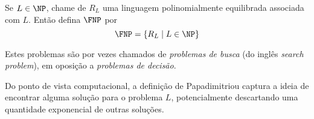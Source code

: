 \begin{definition}
    Se $L \in \NP$, chame de $R_L$
    uma linguagem polinomialmente equilibrada associada com $L$.
    Então defina $\FNP$ por
    \begin{equation*}
        \FNP = \{R_L \mid L \in \NP\}
    \end{equation*}
    \cite[p.~229]{Papadimitriou1994}
\end{definition}

Estes problemas são por vezes chamados de \emph{problemas de busca}
(do inglês \emph{search problem}),
em oposição a \emph{problemas de decisão}.

Do ponto de vista computacional,
a definição de Papadimitriou captura a ideia de
encontrar alguma solução para o problema $L$,
potencialmente descartando uma quantidade exponencial de outras soluções.
